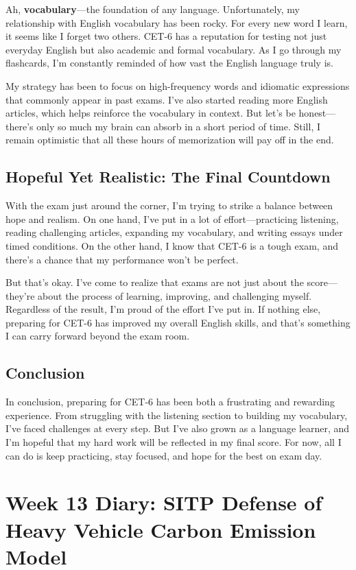 \documentclass[a4paper]{article} 	%
\begin{document}
Ah, \textbf{vocabulary}—the foundation of any language. Unfortunately, my relationship with English vocabulary has been rocky. For every new word I learn, it seems like I forget two others. CET-6 has a reputation for testing not just everyday English but also academic and formal vocabulary. As I go through my flashcards, I’m constantly reminded of how vast the English language truly is.

My strategy has been to focus on high-frequency words and idiomatic expressions that commonly appear in past exams. I’ve also started reading more English articles, which helps reinforce the vocabulary in context. But let’s be honest—there’s only so much my brain can absorb in a short period of time. Still, I remain optimistic that all these hours of memorization will pay off in the end.

\subsection*{Hopeful Yet Realistic: The Final Countdown}

With the exam just around the corner, I’m trying to strike a balance between hope and realism. On one hand, I’ve put in a lot of effort—practicing listening, reading challenging articles, expanding my vocabulary, and writing essays under timed conditions. On the other hand, I know that CET-6 is a tough exam, and there’s a chance that my performance won’t be perfect.

But that’s okay. I’ve come to realize that exams are not just about the score—they’re about the process of learning, improving, and challenging myself. Regardless of the result, I’m proud of the effort I’ve put in. If nothing else, preparing for CET-6 has improved my overall English skills, and that’s something I can carry forward beyond the exam room.

\subsection*{Conclusion}

In conclusion, preparing for CET-6 has been both a frustrating and rewarding experience. From struggling with the listening section to building my vocabulary, I’ve faced challenges at every step. But I’ve also grown as a language learner, and I’m hopeful that my hard work will be reflected in my final score. For now, all I can do is keep practicing, stay focused, and hope for the best on exam day.

\section{Week 13 Diary: SITP Defense of Heavy Vehicle Carbon Emission Model}
\end{document}
